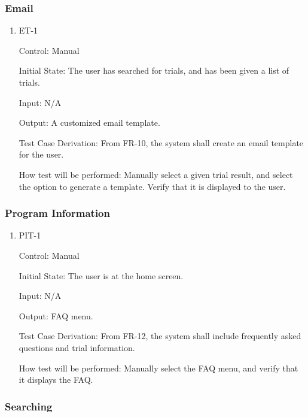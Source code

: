 \documentclass[12pt, titlepage]{article}
\begin{document}
\subsubsection{Email}

\begin{enumerate}


\item{ET-1\\}

Control: Manual
					
Initial State: The user has searched for trials, and has been given a list of trials.
					
Input: N/A
					
Output: A customized email template.

Test Case Derivation: From FR-10, the system shall create an email template for the user.

How test will be performed: Manually select a given trial result, and select the option to generate a template. Verify that it is displayed to the user.

\end{enumerate}

\subsubsection{Program Information}

\begin{enumerate}

\item{PIT-1\\}

Control: Manual
					
Initial State: The user is at the home screen.
					
Input: N/A
					
Output: FAQ menu.

Test Case Derivation: From FR-12, the system shall include frequently asked questions and trial information.

How test will be performed: Manually select the FAQ menu, and verify that it displays the FAQ.


\end{enumerate}

\subsubsection{Searching}
\end{document}
